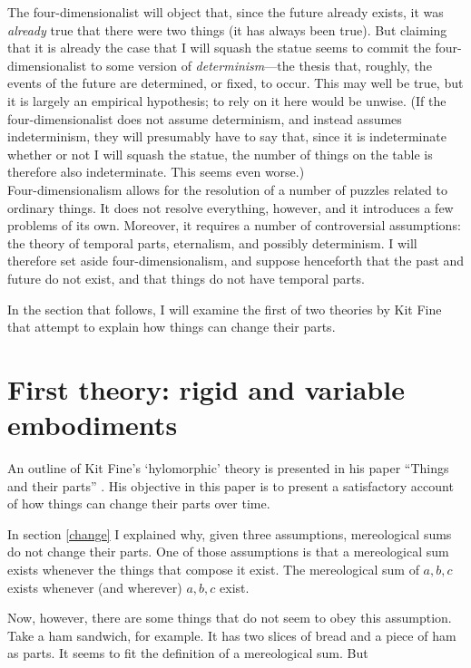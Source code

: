 \documentclass[11pt]{article}
\begin{document}
\begin{spacing}{1.5}
The four-dimensionalist will object that, since the future already
exists, it was {\em already} true that there were two things (it has
always been true).  But claiming that it is already the case that I
will squash the statue seems to commit the four-dimensionalist to some
version of {\em determinism}---the thesis that, roughly, the events of
the future are determined, or fixed, to occur.  This may well be true,
but it is largely an empirical hypothesis; to rely on it here would be
unwise.  (If the four-dimensionalist does not assume determinism, and
instead assumes indeterminism, they will presumably have to say that,
since it is indeterminate whether or not I will squash the statue, the
number of things on the table is therefore also indeterminate.  This
seems even worse.)\\

Four-dimensionalism allows for the resolution of a number of puzzles
related to ordinary things.  It does not resolve everything, however,
and it introduces a few problems of its own.  Moreover, it requires a
number of controversial assumptions: the theory of temporal parts,
eternalism, and possibly determinism.  I will therefore set aside
four-dimensionalism, and suppose henceforth that the past and future
do not exist, and that things do not have temporal parts.

In the section that follows, I will examine the first of two theories
by Kit Fine that attempt to explain how things can change their parts.

\section{First theory: rigid and variable embodiments}
\label{fine-h}
An outline of Kit Fine's `hylomorphic' theory is presented in his
paper ``Things and their parts'' \citeyearpar{fine1999}.  His
objective in this paper is to present a satisfactory account of how
things can change their parts over time.

In section \ref{change} I explained why, given three assumptions,
mereological sums do not change their parts.  One of those assumptions
is that a mereological sum exists whenever the things that compose it
exist.  The mereological sum of $a, b, c$ exists whenever (and
wherever) $a, b, c$ exist.

Now, however, there are some things that do not seem to obey this
assumption.  Take a ham sandwich, for example.  It has two slices of
bread and a piece of ham as parts.  It seems to fit the definition of
a mereological sum.  But


\end{spacing}
\end{document}
